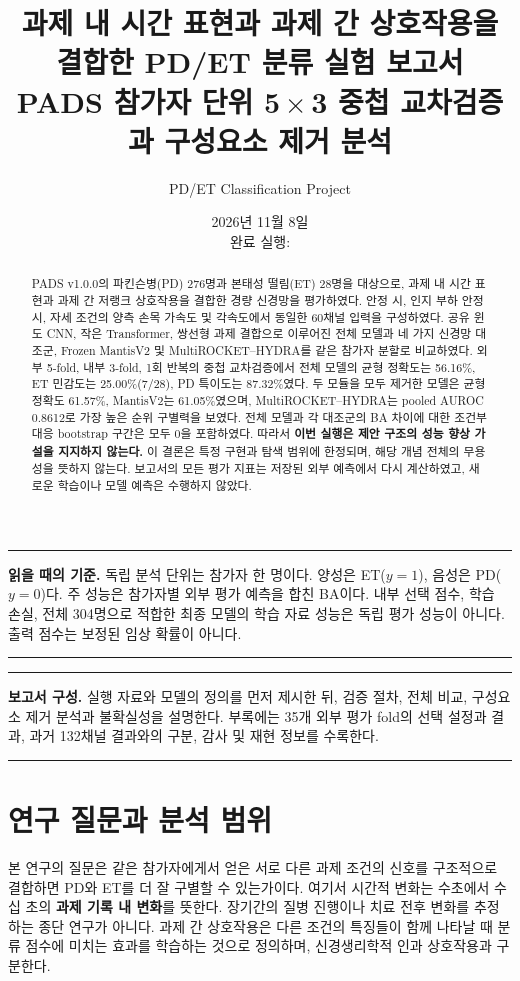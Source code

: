 \documentclass[11pt,a4paper]{article}
\title{\color{navy}\bfseries 과제 내 시간 표현과 과제 간 상호작용을\\[.25em]
 결합한 PD/ET 분류 실험 보고서\\[.6em]
 \large PADS 참가자 단위 5\,$\times$\,3 중첩 교차검증과 구성요소 제거 분석}
\author{PD/ET Classification Project}
\date{2026년 11월 8일\\[.25em]\small 완료 실행: \code{20261108T071720522119Z}}
\numberwithin{equation}{section}
\newenvironment{keybox}{\begin{center}\begin{minipage}{.94\linewidth}\color{navy}\hrule\vspace{.6em}\small}
 {\vspace{.5em}\hrule\end{minipage}\end{center}}
\begin{document}
\maketitle\thispagestyle{empty}
\begin{abstract}
PADS v1.0.0의 파킨슨병(PD) 276명과 본태성 떨림(ET) 28명을 대상으로,
과제 내 시간 표현과 과제 간 저랭크 상호작용을 결합한 경량 신경망을 평가하였다.
안정 시, 인지 부하 안정 시, 자세 조건의 양측 손목 가속도 및 각속도에서
동일한 60채널 입력을 구성하였다. 공유 윈도 CNN, 작은 Transformer,
쌍선형 과제 결합으로 이루어진 전체 모델과 네 가지 신경망 대조군,
Frozen MantisV2 및 MultiROCKET--HYDRA를 같은 참가자 분할로 비교하였다.
외부 5-fold, 내부 3-fold, 1회 반복의 중첩 교차검증에서 전체 모델의
균형 정확도는 56.16\%, ET 민감도는 25.00\%(7/28), PD 특이도는 87.32\%였다.
두 모듈을 모두 제거한 모델은 균형 정확도 61.57\%, MantisV2는 61.05\%였으며,
MultiROCKET--HYDRA는 pooled AUROC 0.8612로 가장 높은 순위 구별력을 보였다.
전체 모델과 각 대조군의 BA 차이에 대한 조건부 대응 bootstrap 구간은 모두 0을 포함하였다.
따라서 \textbf{이번 실행은 제안 구조의 성능 향상 가설을 지지하지 않는다.}
이 결론은 특정 구현과 탐색 범위에 한정되며, 해당 개념 전체의 무용성을 뜻하지 않는다.
보고서의 모든 평가 지표는 저장된 외부 예측에서 다시 계산하였고,
새로운 학습이나 모델 예측은 수행하지 않았다.
\end{abstract}

\begin{keybox}
\textbf{읽을 때의 기준.}
독립 분석 단위는 참가자 한 명이다. 양성은 ET($y=1$), 음성은 PD($y=0$)다.
주 성능은 참가자별 외부 평가 예측을 합친 BA이다.
내부 선택 점수, 학습 손실, 전체 304명으로 적합한 최종 모델의 학습 자료 성능은
독립 평가 성능이 아니다. 출력 점수는 보정된 임상 확률이 아니다.
\end{keybox}
\clearpage
\tableofcontents
\vfill
\begin{keybox}
\textbf{보고서 구성.}
실행 자료와 모델의 정의를 먼저 제시한 뒤, 검증 절차, 전체 비교,
구성요소 제거 분석과 불확실성을 설명한다. 부록에는 35개 외부 평가 fold의
선택 설정과 결과, 과거 132채널 결과와의 구분, 감사 및 재현 정보를 수록한다.
\end{keybox}
\clearpage

\section{연구 질문과 분석 범위}

본 연구의 질문은 같은 참가자에게서 얻은 서로 다른 과제 조건의 신호를
구조적으로 결합하면 PD와 ET를 더 잘 구별할 수 있는가이다.
여기서 시간적 변화는 수초에서 수십 초의 \textbf{과제 기록 내 변화}를 뜻한다.
장기간의 질병 진행이나 치료 전후 변화를 추정하는 종단 연구가 아니다.
과제 간 상호작용은 다른 조건의 특징들이 함께 나타날 때 분류 점수에 미치는
효과를 학습하는 것으로 정의하며, 신경생리학적 인과 상호작용과 구분한다.
\end{document}
